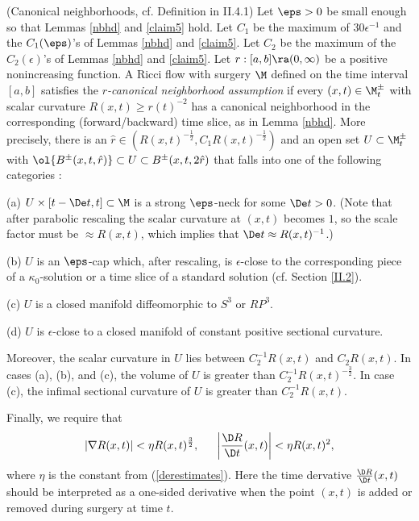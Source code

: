 \begin{definition}
  \label{def:kl-priori-assumptions-canonical-neighborhood-assumption}
(Canonical neighborhoods, cf. Definition in II.4.1)
\label{canonicalnbhddef}
Let $\eps>0$ be
small enough so that Lemmas \ref{nbhd} and \ref{claim5} hold.
Let $C_1$ be the maximum of $30 \epsilon^{-1}$ and the $C_1(\eps)$'s of Lemmas
\ref{nbhd} and \ref{claim5}. Let $C_2$ be the maximum of the
$C_2(\epsilon)$'s of Lemmas
\ref{nbhd} and \ref{claim5}.
Let  $r:[a,b]\ra (0,\infty)$ be a positive nonincreasing function.
A Ricci flow with surgery $\M$ defined on the time interval $[a,b]$ satisfies
the {\em $r$-canonical neighborhood assumption} if every
$(x,t)\in \M_t^\pm$ with scalar curvature $R(x,t)\geq r(t)^{-2}$
has a canonical neighborhood in the corresponding (forward/backward)
time slice, as in Lemma \ref{nbhd}.  More precisely, there is
an  $\hat r\in (R(x,t)^{-\frac12},C_1R(x,t)^{-\frac12})$
and an open
set $U\subset \M_t^\pm$ with
$\ol{B^\pm(x,t,\hat r)}\subset U\subset B^\pm(x,t,2\hat r)$ that
falls into one of the
following categories :

(a) $U\times [t-\De t,t]\subset\M$  is a strong $\eps$-neck
for some $\De t>0$.  (Note that after parabolic rescaling the scalar
curvature at $(x,t)$ becomes $1$, so the scale factor must be
$\approx R(x,t)$, which implies that $\De t\approx R(x,t)^{-1}$.)

(b) $U$ is an $\eps$-cap which, after rescaling, is $\epsilon$-close to the
corresponding piece of a $\kappa_0$-solution or a time slice of a standard
solution (cf. Section \ref{II.2}).

(c) $U$ is a closed manifold diffeomorphic to $S^3$ or $RP^3$.


(d) $U$ is  $\epsilon$-close to
a closed manifold of constant positive sectional
curvature.

\noindent
Moreover, the scalar curvature in $U$ lies between $C_2^{-1}R(x,t)$
and $C_2R(x,t)$.
In cases (a), (b), and  (c), the volume of $U$ is greater than
$C_2^{-1}R(x,t)^{-\frac32}$. In case (c), the infimal
sectional curvature of $U$ is greater than $C_2^{-1}R(x,t)$.

Finally, we require that
\begin{equation}
\label{II.(1.3)estimates}
|\nabla R(x, t)|<\eta R(x, t)^{\frac32}, \: \: \:  \: \: \: \:
\left|\frac{\D R}{\D t} (x, t)\right|<\eta R(x, t)^2,
\end{equation}
where $\eta$ is the constant from (\ref{derestimates}).  Here the time
dervative $\frac{\D R}{\D t} (x, t)$ should be interpreted
as a one-sided derivative when the point $(x,t)$ is added or removed
during surgery at time $t$.
\end{definition}

